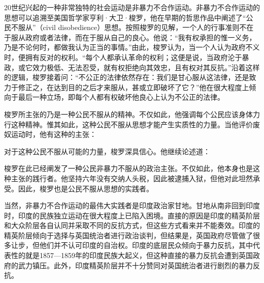 20世纪兴起的一种非常独特的社会运动是非暴力不合作运动。非暴力不合作运动的思想可以追溯至美国哲学家亨利·大卫·梭罗，他在早期的哲思作品中阐述了“公民不服从”（civil disobedience）思想。按照梭罗的见解，一个人的行事准则不在于服从政府或者法律，而在于服从自己的良心。他说：“我有权承担的惟一义务，乃是不论何时，都做我认为正当的事情。”由此，梭罗认为，当一个人认为政府不义时，便拥有反对的权利。“每个人都承认革命的权利；这便是说，当政府沦于暴政，或它效力极低、无法忍受，就有权拒绝向其效忠，且有权对其反抗。”沿着这样的逻辑，梭罗接着问：“不公正的法律依然存在：我们是甘心服从这法律，还是致力于修正之，在达到目的之后才来服从，甚或立即破坏了它？”他在很大程度上倾向于最后一种立场，即每个人都有权破坏他良心上认为不公正的法律。

梭罗所主张的乃是一种公民不服从的精神。不仅如此，他强调每个公民应该身体力行这种精神。惟其如此，这种公民不服从思想才能产生实质性的力量。当他评价废奴运动时，他有这种的主张：


对于这种公民不服从可能的力量，梭罗深具信心。他继续论述道：


梭罗在此已经阐发了一种公民非暴力不服从的政治主张。不仅如此，他本身也是这种主张的践行者。他坚持六年没有交纳人头税，因此被逮捕入狱，但他对此坦然承受。因此，梭罗也是公民不服从思想的实践者。

当然，非暴力不合作运动的最伟大实践者是印度政治家甘地。甘地从南非回到印度时，印度的民族独立运动在很大程度上已陷入困境。直接的原因是印度的精英阶层和大众阶层各自认同并采取不同的反抗方式，但这些方式看来并不能奏效。印度的精英阶层倾向于选择与英国统治者进行政治谈判，但结果是，英国政府尽管做了很多让步，但他们并不认可印度的自治权。印度的底层民众倾向于暴力反抗，其中代表性的就是1857—1859年的印度民族大起义，但这种直接的暴力反抗会遭到英国政府的武力镇压。此外，印度精英阶层并不十分赞同对英国统治者进行剧烈的暴力反抗。

